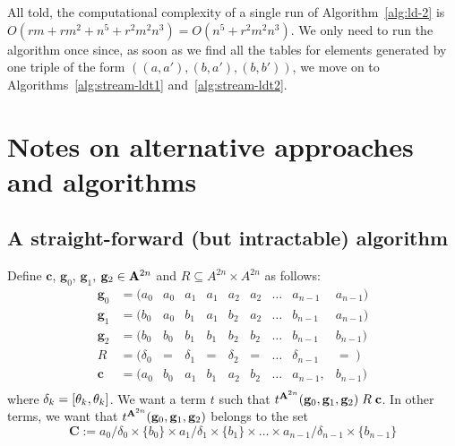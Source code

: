 All told, the computational complexity of a single run of
Algorithm~\ref{alg:ld-2} is $O(rm + rm^2 + n^5 + r^2m^2n^3) = O(n^5 + r^2m^2n^3)$.
We only need to run the algorithm once since, as soon as we find all the
\ldto tables for elements generated by one triple of the form $((a,a'),(b,a'),(b,b'))$,
we move on to Algorithms~\ref{alg:stream-ldt1} and~\ref{alg:stream-ldt2}.




\section{Notes on alternative approaches and algorithms}
\subsection{A straight-forward (but intractable) algorithm}
Define $\mathbf{c}$, $\mathbf{g}_0$, $\mathbf{g}_1$, $\mathbf{g}_2 \in \mathbf{A}^{2n}$
and $R \subseteq A^{2n}\times A^{2n}$ as follows:
\begin{equation}
\begin{array}{cccccccccc}
  \mathbf{g}_0 &= (a_0 & a_0 &a_1 &a_1 &a_2 &a_2 & \dots & a_{n-1} & a_{n-1}) \\
  \mathbf{g}_1 &= (b_0 & a_0 &b_1 &a_1 &b_2 &a_2 & \dots & b_{n-1} & a_{n-1}) \\
  \mathbf{g}_2 &= (b_0 & b_0 &b_1 &b_1 &b_2 &b_2 & \dots & b_{n-1} & b_{n-1})\\[4pt]
    R  & = (\delta_0 & =  & \delta_1 & = & \delta_2 & = & \dots  & \delta_{n-1} & = \; )\\ [4pt]
  \mathbf{c}            & = (a_0     & b_0       & a_1      & b_1      & a_2      & b_2      & \dots  & a_{n-1}, & b_{n-1}) \\
\end{array}
\end{equation}
where $\delta_k= [\theta_k, \theta_k]$.  We want a term $t$ such that $t^{\mathbf{A}^{2n}}(\mathbf{g}_0, \mathbf{g}_1, \mathbf{g}_2)\mathrel{R} \mathbf{c}$.
In other terms, we want that $t^{\mathbf{A}^{2n}}(\mathbf{g}_0, \mathbf{g}_1, \mathbf{g}_2)$ belongs to the set
\[
\mathbf{C} := a_0/\delta_0 \times \{b_0\} \times a_1/\delta_1 \times \{b_1\} \times   \dots \times a_{n-1}/\delta_{n-1} \times \{b_{n-1}\}
\]
